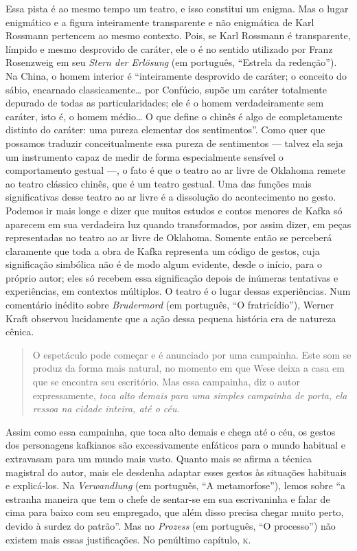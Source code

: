 Essa pista é ao mesmo tempo um teatro, e isso constitui um enigma. Mas o
lugar enigmático e a figura inteiramente transparente e não enigmática
de Karl Rossmann pertencem ao mesmo contexto. Pois, se Karl Rossmann é
transparente, límpido e mesmo desprovido de caráter, ele o é no sentido
utilizado por Franz Rosenzweig em seu \textit{Stern der Erlösung} (em português, ``Estrela da
redenção''). Na China, o homem interior é ``inteiramente desprovido de
caráter; o conceito do sábio, encarnado classicamente\ldots{} por Confúcio,
supõe um caráter totalmente depurado de todas as particularidades; ele é
o homem verdadeiramente sem caráter, isto é, o homem médio\ldots{} O que
define o chinês é algo de completamente distinto do caráter: uma pureza
elementar dos sentimentos''. Como quer que possamos traduzir
conceitualmente essa pureza de sentimentos --- talvez ela seja um
instrumento capaz de medir de forma especialmente sensível o
comportamento gestual ---, o fato é que o teatro ao ar livre de Oklahoma
remete ao teatro clássico chinês, que é um teatro gestual. Uma das
funções mais significativas desse teatro ao ar livre é a dissolução do
acontecimento no gesto. Podemos ir mais longe e dizer que muitos estudos
e contos menores de Kafka só aparecem em sua verdadeira luz quando
transformados, por assim dizer, em peças representadas no teatro ao ar
livre de Oklahoma. Somente então se perceberá claramente que toda a obra
de Kafka representa um código de gestos, cuja significação simbólica não
é de modo algum evidente, desde o início, para o próprio autor; eles só
recebem essa significação depois de inúmeras tentativas e experiências,
em contextos múltiplos. O teatro é o lugar dessas experiências. Num
comentário inédito sobre \textit{Brudermord} (em português, ``O fratricídio''), Werner Kraft
observou lucidamente que a ação dessa pequena história era de natureza
cênica. 

\begin{quote}
O espetáculo pode começar e é anunciado por uma campainha.
Este som se produz da forma mais natural, no momento em que Wese deixa a
casa em que se encontra seu escritório. Mas essa campainha, diz o autor
expressamente, \textit{toca alto demais para uma simples campainha de porta,
ela ressoa na cidade inteira, até o céu}. 
\end{quote}

Assim como essa campainha,
que toca alto demais e chega até o céu, os gestos dos personagens
kafkianos são excessivamente enfáticos para o mundo habitual e
extravasam para um mundo mais vasto. Quanto mais se afirma a técnica
magistral do autor, mais ele desdenha adaptar esses gestos às situações
habituais e explicá-los. Na \textit{Verwandlung} (em português, ``A metamorfose''), lemos sobre
``a estranha maneira que tem o chefe de sentar-se em sua escrivaninha e
falar de cima para baixo com seu empregado, que além disso precisa
chegar muito perto, devido à surdez do patrão''. Mas no \textit{Prozess} (em português, ``O
processo'') não existem mais essas justificações. No penúltimo capítulo,
\textsc{k.} 

